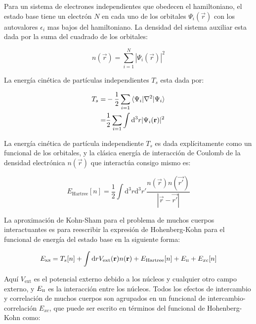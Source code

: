 Para un sistema de electrones independientes que obedecen el hamiltoniano, el estado base tiene un electrón $N$ en cada uno de los orbitales $\Psi_{i}(\vec{r})$ con los autovalores $\epsilon_{i}$ mas bajos del hamiltoniano. La densidad del sistema auxiliar esta dada por la suma del cuadrado de los orbitales:

\begin{equation}
    n(\vec{r})=\sum_{i=1}^{N}|\Psi_{i}(\vec{r})|^{2}
    \label{Eq. density-elec}
\end{equation}

La energía cinética de partículas independientes $T_{s}$ esta dada por:

\begin{equation}
    \begin{split}
       T_{s}=&-\frac{1}{2}\sum_{i=1}\braket{\Psi_{i}|\nabla^{2}|\Psi_{i}}\\
       =&\frac{1}{2}\sum_{i=1}\int\mathrm{d^{3}}r|\Psi_{i}(\mathbf{r})|^{2}
    \end{split}
\end{equation}

La energía cinética de partícula independiente $T_{s}$ es dada explícitamente como un funcional de los orbitales, y la clásica energía de interacción de Coulomb de la densidad electrónica $n(\vec{r})$ que interactúa consigo mismo es:

\begin{equation}
    E_{\text{Hartree}}[n]=\frac{1}{2}\int\mathrm{d^{3}}r\mathrm{d^{3}}r'\frac{n(\vec{r})n(\vec{r'})}{|\vec{r}-\vec{r'}|}
\end{equation}

La aproximación de Kohn-Sham para el problema de muchos cuerpos interactuantes es para reescribir la expresión de Hohenberg-Kohn para el funcional de energía del estado base en la siguiente forma:

\begin{equation}
    E_{\textsc{ks}}=T_{s}[n]+\int\mathrm{d}rV_{\text{ext}}(\vec{r})n(\vec{r})+E_{\text{Hartree}}[n]+E_{\textsc{ii}}+E_{xc}[n] 
    \label{Eq. KS}
\end{equation}

Aquí $V_{\text{ext}}$ es el potencial externo debido a los núcleos y cualquier otro campo externo, y $E_{\textsc{ii}}$ es la interacción entre los núcleos. Todos los efectos de intercambio y correlación de muchos cuerpos son agrupados en un funcional de intercambio-correlación $E_{xc}$, que puede ser escrito en términos del funcional de Hohenberg-Kohn como:

